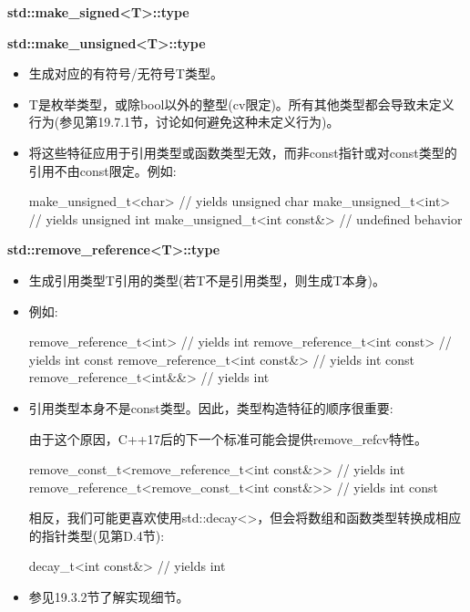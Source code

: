 \textbf{std::make\_signed<T>::type}

\textbf{std::make\_unsigned<T>::type}

\begin{itemize}
\item
生成对应的有符号/无符号T类型。

\item
T是枚举类型，或除bool以外的整型(cv限定)。所有其他类型都会导致未定义行为(参见第19.7.1节，讨论如何避免这种未定义行为)。

\item
将这些特征应用于引用类型或函数类型无效，而非const指针或对const类型的引用不由const限定。例如:
\begin{cpp}
make_unsigned_t<char> // yields unsigned char
make_unsigned_t<int> // yields unsigned int
make_unsigned_t<int const&> // undefined behavior
\end{cpp}
\end{itemize}

\textbf{std::remove\_reference<T>::type}

\begin{itemize}
\item
生成引用类型T引用的类型(若T不是引用类型，则生成T本身)。

\item
例如:
\begin{cpp}
remove_reference_t<int> // yields int
remove_reference_t<int const> // yields int const
remove_reference_t<int const&> // yields int const
remove_reference_t<int&&> // yields int
\end{cpp}

\item
引用类型本身不是const类型。因此，类型构造特征的顺序很重要:

\begin{notice}由于这个原因，C++17后的下一个标准可能会提供remove\_refcv特性。
\end{notice}

\begin{cpp}
remove_const_t<remove_reference_t<int const&>> // yields int
remove_reference_t<remove_const_t<int const&>> // yields int const
\end{cpp}

相反，我们可能更喜欢使用std::decay<>，但会将数组和函数类型转换成相应的指针类型(见第D.4节):

\begin{cpp}
decay_t<int const&> // yields int
\end{cpp}

\item
参见19.3.2节了解实现细节。
\end{itemize}


